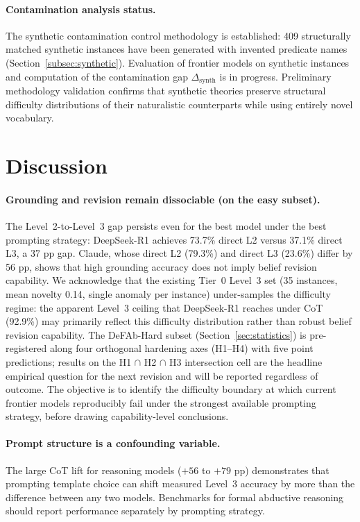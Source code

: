 \documentclass{article}
\theoremstyle{definition}
\begin{document}
\paragraph{Contamination analysis status.}
The synthetic contamination control methodology is established: 409 structurally matched synthetic instances have been generated with invented predicate names (Section~\ref{subsec:synthetic}). Evaluation of frontier models on synthetic instances and computation of the contamination gap $\Delta_{\mathrm{synth}}$ is in progress. Preliminary methodology validation confirms that synthetic theories preserve structural difficulty distributions of their naturalistic counterparts while using entirely novel vocabulary.


\section{Discussion}\label{sec:discussion}

\paragraph{Grounding and revision remain dissociable (on the easy subset).}
The Level~2-to-Level~3 gap persists even for the best model under the best prompting strategy: DeepSeek-R1 achieves 73.7\% direct L2 versus 37.1\% direct L3, a 37 pp gap. Claude, whose direct L2 (79.3\%) and direct L3 (23.6\%) differ by 56 pp, shows that high grounding accuracy does not imply belief revision capability. We acknowledge that the existing Tier~0 Level~3 set (35 instances, mean novelty 0.14, single anomaly per instance) under-samples the difficulty regime: the apparent Level~3 ceiling that DeepSeek-R1 reaches under CoT (92.9\%) may primarily reflect this difficulty distribution rather than robust belief revision capability. The DeFAb-Hard subset (Section~\ref{sec:statistics}) is pre-registered along four orthogonal hardening axes (H1--H4) with five point predictions; results on the H1 $\cap$ H2 $\cap$ H3 intersection cell are the headline empirical question for the next revision and will be reported regardless of outcome. The objective is to identify the difficulty boundary at which current frontier models reproducibly fail under the strongest available prompting strategy, before drawing capability-level conclusions.

\paragraph{Prompt structure is a confounding variable.}
The large CoT lift for reasoning models ($+56$ to $+79$ pp) demonstrates that prompting template choice can shift measured Level~3 accuracy by more than the difference between any two models. Benchmarks for formal abductive reasoning should report performance separately by prompting strategy.
\end{document}
